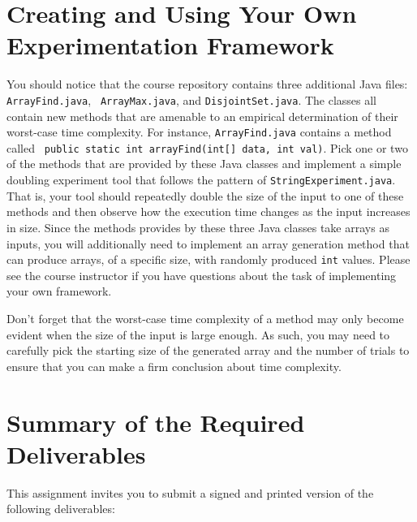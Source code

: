 \section*{Creating and Using Your Own Experimentation Framework}

You should notice that the course repository contains three additional Java files: {\tt ArrayFind.java}, {\tt
ArrayMax.java}, and {\tt DisjointSet.java}. The classes all contain new methods that are amenable to an empirical
determination of their worst-case time complexity. For instance, {\tt ArrayFind.java} contains a method called {\tt
public static int arrayFind(int[] data, int val)}.  Pick one or two of the methods that are provided by these Java
classes and implement a simple doubling experiment tool that follows the pattern of {\tt StringExperiment.java}. That
is, your tool should repeatedly double the size of the input to one of these methods and then observe how the execution
time changes as the input increases in size. Since the methods provides by these three Java classes take arrays as
inputs, you will additionally need to implement an array generation method that can produce arrays, of a specific size,
with randomly produced {\tt int} values.  Please see the course instructor if you have questions about the task of
implementing your own framework.

  Don't forget that the worst-case time complexity of a method may only become evident when the size of the input is
  large enough. As such, you may need to carefully pick the starting size of the generated array and the number of
  trials to ensure that you can make a firm conclusion about time complexity.

\section*{Summary of the Required Deliverables}

  This assignment invites you to submit a signed and printed version of the following deliverables:

